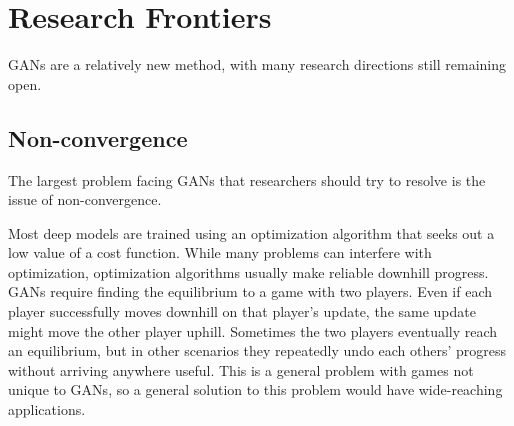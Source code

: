 \section{Research Frontiers}

GANs are a relatively new method, with many research directions still
remaining open.

\subsection{Non-convergence}

The largest problem facing GANs that researchers should try to resolve is the issue
of non-convergence.

Most deep models are trained using an optimization algorithm that seeks out a low
value of a cost function.
While many problems can interfere with optimization, optimization algorithms usually
make reliable downhill progress.
GANs require finding the equilibrium to a game with two players.
Even if each player successfully moves downhill on that player's update,
the same update might move the other player uphill.
Sometimes the two players eventually reach an equilibrium, but in other scenarios
they repeatedly undo each others' progress without arriving anywhere useful.
This is a general problem with games not unique to GANs, so a general solution
to this problem would have wide-reaching applications.


